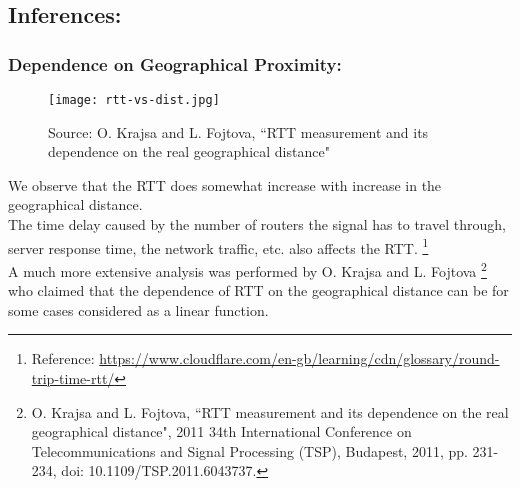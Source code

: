 \documentclass[11pt, fleqn]{article}
\begin{document}
\hrulefill

\newpage 

\subsection*{Inferences:}

\subsubsection*{Dependence on Geographical Proximity:}

\begin{figure}[H]
    \centering
    \texttt{[image: rtt-vs-dist.jpg]}
    \caption{Source: O. Krajsa and L. Fojtova, ``RTT measurement and its dependence on the real geographical distance"}
    \label{fig:rtt_vs_dist}
\end{figure}

We observe that the RTT does somewhat increase with increase in the geographical distance.\\
The time delay caused by the number of routers the signal has to travel through, server response time, the network traffic, etc. also affects the RTT. \footnote{Reference:
\url{https://www.cloudflare.com/en-gb/learning/cdn/glossary/round-trip-time-rtt/}}\\
A much more extensive analysis was performed by O. Krajsa and L. Fojtova \footnote{O. Krajsa and L. Fojtova, ``RTT measurement and its dependence on the real geographical distance", 2011 34th International Conference on Telecommunications and Signal Processing (TSP), Budapest, 2011, pp. 231-234, doi: 10.1109/TSP.2011.6043737.} who claimed that the dependence of RTT on the geographical distance can be for some cases considered as a linear function.

\end{document}
